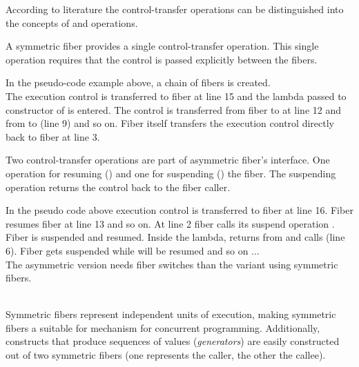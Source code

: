
According to literature\cite{Moura2009} the control-transfer operations can be
distinguished into the concepts of \sym and \asym operations.

 A symmetric fiber provides a single
control-transfer operation. This single operation requires that the control is
passed explicitly between the fibers.\\


In the pseudo-code example above, a chain of fibers is created.\\
The execution control is transferred to fiber  at line 15 and the lambda
passed to constructor of  is entered. The control is transferred from
fiber  to  at line 12 and from  to  (line 9) and
so on. Fiber  itself transfers the execution control directly back to
fiber  at line 3.

 Two control-transfer operations are part of
asymmetric fiber's interface. One operation for resuming (\resume) and one for
suspending () the fiber. The suspending operation returns the
control back to the fiber caller.\\

In the pseudo code above execution control is transferred to fiber  at
line 16. Fiber  resumes fiber  at line 13 and so on. At line 2
fiber  calls its suspend operation . Fiber 
is suspended and  resumed. Inside the lambda,  returns from
 and calls  (line 6). Fiber  gets
suspended while  will be resumed and so on ...\\
The asymmetric version needs  fiber switches than the variant
using symmetric fibers.\\

\\
\newline

Symmetric fibers represent independent units of execution, making symmetric
fibers a suitable for mechanism for concurrent programming. Additionally,
constructs that produce sequences of values (\emph{generators}) are easily
constructed out of two symmetric fibers (one represents the caller, the other
the callee).\\

